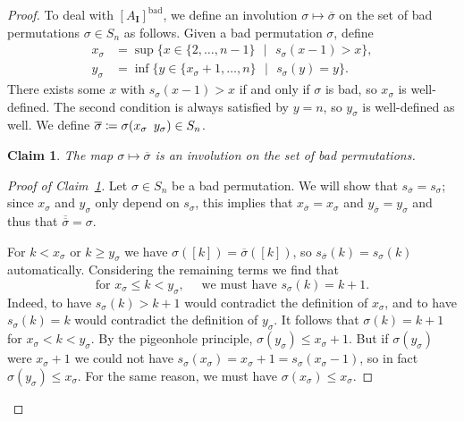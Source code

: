 \documentclass[11 pt]{article}
\theoremstyle{plain}
\newtheorem{claims}{Claim}
\theoremstyle{definition}
\numberwithin{equation}{section}
\newcommand\Set[2]{\ensuremath{\{\text{#1 $|$ #2}\}}}
\newcommand\II{\mathbf{I}}
\newcommand\coloneq{\mathrel{\mathop:}\mkern-1.2mu=}
\begin{document}
\begin{proof}
To deal with $[A_{\II}]^{\text{bad}}$, we 
define an involution $\sigma \mapsto \overline{\sigma}$ on the set of bad permutations 
$\sigma\in S_n$ as follows. Given a bad permutation $\sigma$, define
\begin{align*}
x_\sigma&=\sup\Set{$x\in \{2,\ldots,n-1\}$}{$s_\sigma(x-1)>x$},\\
y_\sigma&=\inf\Set{$y\in \{x_\sigma+1,\ldots,n\}$}{$s_\sigma(y)=y$}.
\end{align*}
There exists some $x$ with $s_\sigma(x-1)>x$ if and only if $\sigma$ is bad, so $x_\sigma$ 
is well-defined.  The second condition is always satisfied by $y=n$, so $y_\sigma$ is 
well-defined as well.  We define 
$\overline{\sigma}\coloneq \sigma (x_\sigma\ \,y_\sigma)\in S_n$.

\begin{claims}
\label{claim:invol}
The map $\sigma \mapsto \overline{\sigma}$ is an involution on the set
of bad permutations.
\end{claims}
\begin{proof}[Proof of Claim~\ref{claim:invol}]
Let $\sigma \in S_n$ be a bad permutation. We will show that $s_{\overline{\sigma}}=s_\sigma$; since $x_\sigma$ and $y_\sigma$ only depend on $s_\sigma$, %
this implies that  $x_{\overline{\sigma}}=x_\sigma$ and $y_{\overline{\sigma}}=y_\sigma$ and thus that $\overline{\overline{\sigma}} = \sigma$.

For $k<x_\sigma$ or $k\geq y_\sigma$ we have $\sigma([k])=\overline{\sigma}([k])$, so $s_{\overline{\sigma}}(k)=s_\sigma(k)$ automatically.
Considering the remaining terms we find that
\begin{equation}
\label{eq:xsys}
\text{for }x_\sigma\leq k<y_\sigma,\quad \text{ we must have }s_\sigma(k)=k+1.
\end{equation}
Indeed, to have $s_\sigma(k)>k+1$ 
would contradict the definition of $x_\sigma$, and to have $s_\sigma(k)=k$ would 
contradict the definition of $y_\sigma$. %
%
It follows that $\sigma(k)=k+1$ for 
$x_\sigma<k<y_\sigma$. By the pigeonhole principle, 
$\sigma(y_\sigma)\leq x_{\sigma}+1$.  But if $\sigma(y_\sigma)$ were $x_{\sigma}+1$ we 
could not have $s_\sigma(x_\sigma)=x_\sigma+1=s_\sigma(x_\sigma-1)$, so in fact $\sigma(y_\sigma)\leq x_\sigma$. 
For the same reason, we must have 
$\sigma(x_\sigma)\leq x_\sigma$.


\end{proof}
\end{proof}
\end{document}
